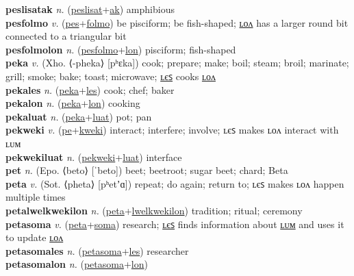 \textbf{peslisatak} \textit{n.} (\hyperref[peslisat]{peslisat}+\hyperref[ak]{ak})
amphibious \label{peslisatak} \\
\textbf{pesfolmo} \textit{v.} (\hyperref[pes]{pes}+\hyperref[folmo]{folmo})
be pisciform; be fish-shaped; \hyperref[pesfolmolon]{ʟᴏᴧ} has a larger round bit connected to a triangular bit \label{pesfolmo} \\
\textbf{pesfolmolon} \textit{n.} (\hyperref[pesfolmo]{pesfolmo}+\hyperref[lon]{lon})
pisciform; fish-shaped \label{pesfolmolon} \\
\textbf{peka} \textit{v.} (Xho. ⟨-pheka⟩ [pʰɛka])
cook; prepare; make; boil; steam; broil; marinate; grill; smoke; bake; toast; microwave; \hyperref[pekales]{ʟєꜱ} cooks \hyperref[pekalon]{ʟᴏᴧ} \label{peka} \\
\textbf{pekales} \textit{n.} (\hyperref[peka]{peka}+\hyperref[les]{les})
cook; chef; baker \label{pekales} \\
\textbf{pekalon} \textit{n.} (\hyperref[peka]{peka}+\hyperref[lon]{lon})
cooking \label{pekalon} \\
\textbf{pekaluat} \textit{n.} (\hyperref[peka]{peka}+\hyperref[luat]{luat})
pot; pan \label{pekaluat} \\
\textbf{pekweki} \textit{v.} (\hyperref[pe]{pe}+\hyperref[kweki]{kweki})
interact; interfere; involve; ʟєꜱ makes ʟᴏᴧ interact with ʟᴜᴍ \label{pekweki} \\
\textbf{pekwekiluat} \textit{n.} (\hyperref[pekweki]{pekweki}+\hyperref[luat]{luat})
interface \label{pekwekiluat} \\
\textbf{pet} \textit{n.} (Epo. ⟨beto⟩ [ˈbeto])
beet; beetroot; sugar beet; chard; Beta \label{pet} \\
\textbf{peta} \textit{v.} (Sot. ⟨pheta⟩ [pʰetʼɑ])
repeat; do again; return to; ʟєꜱ makes ʟᴏᴧ happen multiple times \label{peta} \\
\textbf{petalwelkwekilon} \textit{n.} (\hyperref[peta]{peta}+\hyperref[lwelkwekilon]{lwelkwekilon})
tradition; ritual; ceremony \label{petalwelkwekilon} \\
\textbf{petasoma} \textit{v.} (\hyperref[peta]{peta}+\hyperref[soma]{soma})
research; \hyperref[petasomales]{ʟєꜱ} finds information about \hyperref[petasomalum]{ʟᴜᴍ} and uses it to update \hyperref[petasomalon]{ʟᴏᴧ} \label{petasoma} \\
\textbf{petasomales} \textit{n.} (\hyperref[petasoma]{petasoma}+\hyperref[les]{les})
researcher \label{petasomales} \\
\textbf{petasomalon} \textit{n.} (\hyperref[petasoma]{petasoma}+\hyperref[lon]{lon})
